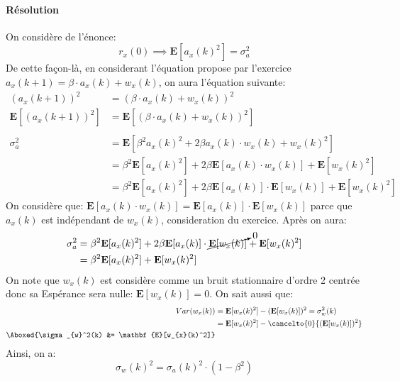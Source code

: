 \documentclass{article}
\begin{document}
\paragraph{Résolution}On considère de l'énonce:
\begin{equation}
    r_{x}(0) \implies \boxed{\mathbf{E}[a_{x}(k)^{2}] = \sigma_{a}^{2}}
\end{equation}
\noindent De cette façon-là, en considerant l'équation propose par l'exercice $a_{x}(k+1) = \beta \cdot a_{x}(k) + w_{x}(k)$, on aura l'équation suivante:
\begin{align*}
    (a_{x}(k+1))^2 &= (\beta \cdot a_{x}(k) + w_{x}(k))^2\\
    \mathbf{E}[(a_{x}(k+1))^2] &= \mathbf{E}[(\beta \cdot a_{x}(k) + w_{x}(k))^2]\\\\
    \sigma_{a}^{2} &= \mathbf{E}[\beta^2 a_{x}(k)^{2} + 2 \beta a_{x}(k) \cdot w_{x}(k) + w_{x}(k)^2]\\
    &= \beta^2 \mathbf{E}[a_{x}(k)^{2}] + 2 \beta \mathbf{E}[a_{x}(k) \cdot w_{x}(k)] + \mathbf{E}[w_{x}(k)^2]\\
    &= \beta^2 \mathbf{E}[a_{x}(k)^{2}] + 2 \beta \mathbf{E}[a_{x}(k)] \cdot \mathbf{E}[w_{x}(k)] + \mathbf{E}[w_{x}(k)^2]
\end{align*}
\noindent On considère que: $\mathbf{E}[a_{x}(k) \cdot w_{x}(k)] = \mathbf{E}[a_{x}(k)] \cdot \mathbf{E}[w_{x}(k)]$ parce que $a_{x}(k)$ est indépendant de $w_{x}(k)$, consideration du exercice. Après on aura:
\begin{align*}
    \sigma_{a}^{2} &= \beta^2 \mathbf{E}[a_{x}(k)^{2}] + 2 \beta \mathbf{E}[a_{x}(k)] \cdot \cancelto{0}{\mathbf{E}[w_{x}(k)]} + \mathbf{E}[w_{x}(k)^2]\\
     &= \beta^2 \mathbf{E}[a_{x}(k)^{2}] + \mathbf{E}[w_{x}(k)^2]
\end{align*}
\noindent On note que $w_{x}(k)$ est considère comme un bruit stationnaire d'ordre 2 centrée donc sa Espérance sera nulle: $\mathbf{E}[w_{x}(k)] = 0$. On sait aussi que:
\begin{align*}
     Var(w_{x}(k)) &= \mathbf{E}[w_{x}(k)^2] - (\mathbf{E}[w_{x}(k)])^2 = \sigma_{w}^2(k)\\
     &= \mathbf{E}[w_{x}(k)^2] - \cancelto{0}{(\mathbf{E}[w_{x}(k)])^2}\\
     \Aboxed{\sigma_{w}^2(k) &= \mathbf{E}[w_{x}(k)^2]}
\end{align*}
\noindent Ainsi, on a:
\begin{equation*}
    \boxed{\sigma_{w}(k)^2 = \sigma_{a}(k)^2 \cdot ( 1 - \beta^2 )}
\end{equation*}
\end{document}
